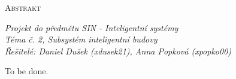 \documentclass[a4paper,12pt]{article}
\renewcommand{\baselinestretch}{1.2}
\begin{document}
	

	\setlength{\parindent}{0pt}
	\vspace*{10pt}
	\LARGE \textsc{Abstrakt}
	\normalsize

	\vspace*{5pt}
	\textit{Projekt do předmětu SIN - Inteligentní systémy} \\
	\textit{Téma č. 2, Subsystém inteligentní budovy} \\
	\textit{Řešitelé: Daniel Dušek (xdusek21), Anna Popková (xpopko00)}

	\setlength{\parindent}{15pt}
	\setlength{\parskip}{15pt}
	\renewcommand{\baselinestretch}{1.5}
	\vspace*{15pt}
	
	To be done.
	
\end{document}
